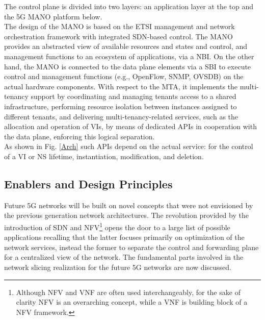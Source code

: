 \documentclass{report}
\begin{document}
The control plane is divided into two layers: an application layer at the top and the 5G \gls{MANO} platform below. \\
The design of the MANO is based on the ETSI management and network orchestration framework with integrated SDN-based control. The MANO
provides an abstracted view of available resources and states and control, and
management functions to an ecosystem of applications, via a \gls{NBI}. On the other hand, the MANO is connected to the data plane
elements via a \gls{SBI} to execute control and management
functions (e.g., OpenFlow, SNMP, OVSDB) on the actual hardware components.
With respect to the \gls{MTA}, it implements the
multi-tenancy support by coordinating and managing tenants access to a shared
infrastructure, performing resource isolation between instances assigned to
different tenants, and delivering multi-tenancy-related services, such as the
allocation and operation of VIs, by means of dedicated APIs in cooperation
with the data plane, enforcing this logical separation. \\
As shown in Fig. \ref{Arch}
such APIs depend on the actual service: for the control of a VI or NS lifetime,
instantiation, modification, and deletion.

\subsection{Enablers and Design Principles}
Future 5G networks will be built on novel concepts that were not envisioned by the previous generation
network architectures. The revolution provided by the introduction of SDN
and \gls{NFV}\footnote{Although NFV and VNF are often used interchangeably, for the sake of clarity NFV is an overarching concept, while a VNF is building block of a NFV framework.} opens the door to a
large list of possible applications recalling that the latter focuses primarily on optimization of the network services, instead the former to separate the control and forwarding plane for a centralized view of the network. The fundamental parts involved in the network slicing realization for the future 5G networks are now discussed.
\end{document}
